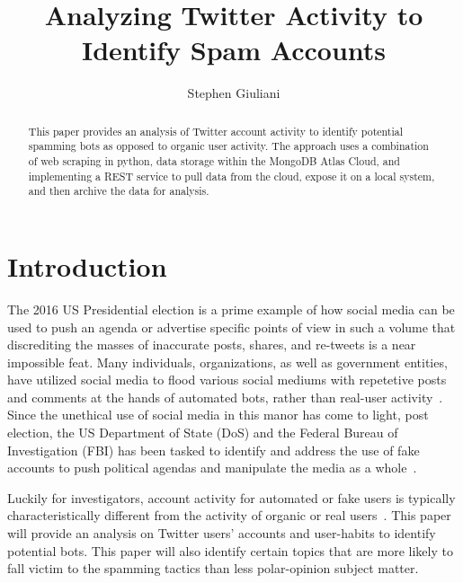 
\title{Analyzing Twitter Activity to Identify Spam Accounts}


\author{Stephen Giuliani}

\renewcommand{\shortauthors}{S. Giuliani}


\begin{abstract}
This paper provides an analysis of Twitter account activity to identify
potential spamming bots as opposed to organic user activity. The approach uses
a combination of web scraping in python, data storage within the MongoDB Atlas
Cloud, and implementing a REST service to pull data from the cloud, expose it
on a local system, and then archive the data for analysis.  \end{abstract}



\maketitle

\section{Introduction}

The 2016 US Presidential election is a prime example of how social media can be
used to push an agenda or advertise specific points of view in such a volume
that discrediting the masses of inaccurate posts, shares, and re-tweets is a
near impossible feat. Many individuals, organizations, as well as government
entities, have utilized social media to flood various social mediums with
repetetive posts and comments at the hands of automated bots, rather than
real-user activity~\cite{WPostTwitterBots}. Since the unethical use of social
media in this manor has come to light, post election, the US Department of
State (DoS) and the Federal Bureau of Investigation (FBI) has been tasked to
identify and address the use of fake accounts to push political agendas and
manipulate the media as a whole~\cite{FBISocialMediaInvestigation}.

Luckily for investigators, account activity for automated or fake users is
typically characteristically different from the activity of organic or real
users~\cite{BDSTwitterBots}. This paper will provide an analysis on Twitter
users' accounts and user-habits to identify potential bots. This paper will
also identify certain topics that are more likely to fall victim to the
spamming tactics than less polar-opinion subject matter.

